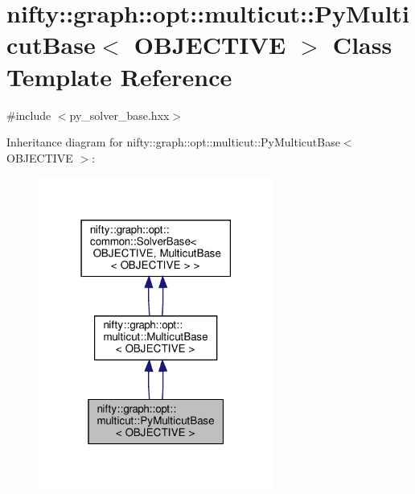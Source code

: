 \hypertarget{classnifty_1_1graph_1_1opt_1_1multicut_1_1PyMulticutBase}{}\section{nifty\+:\+:graph\+:\+:opt\+:\+:multicut\+:\+:Py\+Multicut\+Base$<$ O\+B\+J\+E\+C\+T\+I\+VE $>$ Class Template Reference}
\label{classnifty_1_1graph_1_1opt_1_1multicut_1_1PyMulticutBase}


{\ttfamily \#include $<$py\+\_\+solver\+\_\+base.\+hxx$>$}



Inheritance diagram for nifty\+:\+:graph\+:\+:opt\+:\+:multicut\+:\+:Py\+Multicut\+Base$<$ O\+B\+J\+E\+C\+T\+I\+VE $>$\+:
\nopagebreak
\begin{figure}[H]
\begin{center}
\leavevmode
\includegraphics[width=219pt]{classnifty_1_1graph_1_1opt_1_1multicut_1_1PyMulticutBase__inherit__graph}
\end{center}
\end{figure}


